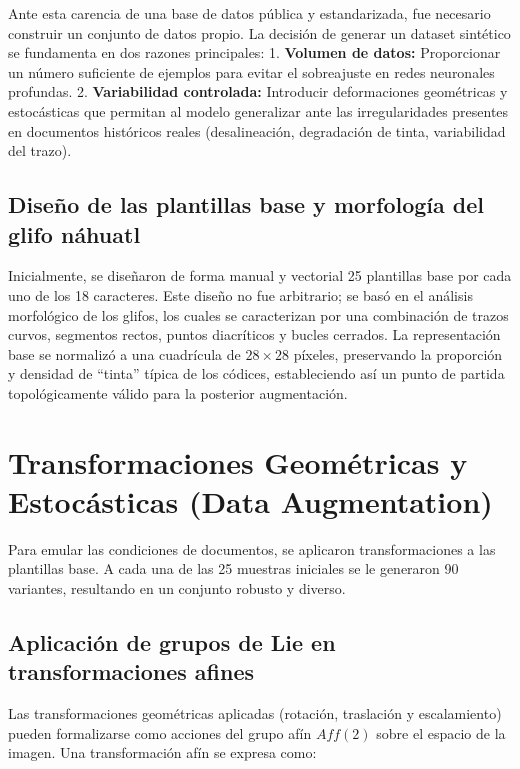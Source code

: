 \documentclass[
  spanish,
  us-letterpaper,
  DIV=11,
  numbers=noendperiod]{scrreprt}
\begin{document}
Ante esta carencia de una base de datos pública y estandarizada, fue
necesario construir un conjunto de datos propio. La decisión de generar
un dataset sintético se fundamenta en dos razones principales: 1.
\textbf{Volumen de datos:} Proporcionar un número suficiente de ejemplos
para evitar el sobreajuste en redes neuronales profundas. 2.
\textbf{Variabilidad controlada:} Introducir deformaciones geométricas y
estocásticas que permitan al modelo generalizar ante las irregularidades
presentes en documentos históricos reales (desalineación, degradación de
tinta, variabilidad del trazo).

\subsection{Diseño de las plantillas base y morfología del glifo
náhuatl}\label{diseuxf1o-de-las-plantillas-base-y-morfologuxeda-del-glifo-nuxe1huatl}

Inicialmente, se diseñaron de forma manual y vectorial 25 plantillas
base por cada uno de los 18 caracteres. Este diseño no fue arbitrario;
se basó en el análisis morfológico de los glifos, los cuales se
caracterizan por una combinación de trazos curvos, segmentos rectos,
puntos diacríticos y bucles cerrados. La representación base se
normalizó a una cuadrícula de \(28 \times 28\) píxeles, preservando la
proporción y densidad de ``tinta'' típica de los códices, estableciendo
así un punto de partida topológicamente válido para la posterior
augmentación.

\section{Transformaciones Geométricas y Estocásticas (Data
Augmentation)}\label{transformaciones-geomuxe9tricas-y-estocuxe1sticas-data-augmentation}

Para emular las condiciones de documentos, se aplicaron transformaciones
a las plantillas base. A cada una de las 25 muestras iniciales se le
generaron 90 variantes, resultando en un conjunto robusto y diverso.

\subsection{Aplicación de grupos de Lie en transformaciones
afines}\label{aplicaciuxf3n-de-grupos-de-lie-en-transformaciones-afines}

Las transformaciones geométricas aplicadas (rotación, traslación y
escalamiento) pueden formalizarse como acciones del grupo afín
\(Aff(2)\) sobre el espacio de la imagen. Una transformación afín se
expresa como:
\end{document}
